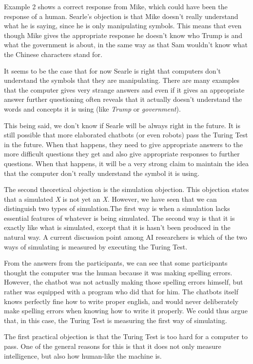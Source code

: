 Example 2 shows a correct response from Mike, which could have been the response of a human. Searle's objection is that Mike doesn't really understand what he is saying, since he is only manipulating symbols. This means that even though Mike gives the appropriate response he doesn't know who Trump is and what the government is about, in the same way as that Sam wouldn't know what the Chinese characters stand for.

It seems to be the case that for now Searle is right that computers don't understand the symbols that they are manipulating. There are many examples that the computer gives very strange answers and even if it gives an appropriate answer further questioning often reveals that it actually doesn't understand the words and concepts it is using (like \textit{Trump} or \textit{government}).

This being said, we don't know if Searle will be always right in the future. It is still possible that more elaborated chatbots (or even robots) pass the Turing Test in the future. When that happens, they need to give appropriate answers to the more difficult questions they get and also give appropriate responses to further questions. When that happens, it will be a very strong claim to maintain the idea that the computer don't really understand the symbol it is using.

The second theoretical objection is the simulation objection. This objection states that a simulated \textit{X} is not yet an \textit{X}. However, we have seen that we can distinguish two types of simulation.The first way is when a simulation lacks essential features of whatever is being simulated. The second way is that it is exactly like what is simulated, except that it is hasn't been produced in the natural way. A current discussion point among AI researchers is which of the two ways of simulating is measured by executing the Turing Test.

From the answers from the participants, we can see that some participants thought the computer was the human because it was making spelling errors. However, the chatbot was not actually making those spelling errors himself, but rather was equipped with a program who did that for him. The chatbots itself knows perfectly fine how to write proper english, and would never deliberately make spelling errors when knowing how to write it properly. We could thus argue that, in this case, the Turing Test is measuring the first way of simulating.

The first practical objection is that the Turing Test is too hard for a computer to pass. One of the general reasons for this is that it does not only measure intelligence, but also how human-like the machine is.

